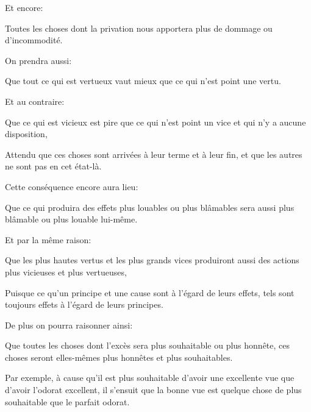 \bigbreak

Et encore:

\begin{lieu}
	Toutes les choses dont la privation nous apportera plus de dommage ou d'incommodité.
\end{lieu}

\bigbreak

On prendra aussi:

\begin{lieu}
	Que tout ce qui est vertueux vaut mieux que ce qui n'est point une vertu.
\end{lieu}

Et au contraire:

\begin{lieu}
	Que ce qui est vicieux est pire que ce qui n'est point un vice et qui n'y a aucune disposition,
\end{lieu}

Attendu que ces choses sont arrivées à leur terme et à leur fin, et que les autres ne sont pas en cet état-là.

\bigbreak

Cette conséquence encore aura lieu:

\begin{lieu}
	Que ce qui produira des effets plus louables ou plus blâmables sera aussi plus blâmable ou plus louable
	lui-même.
\end{lieu}

Et par la même raison:

\begin{lieu}
	Que les plus hautes vertus et les plus grands vices produiront aussi des actions plus vicieuses et plus
	vertueuses,
\end{lieu}

Puisque ce qu'un principe et une cause sont à l’égard de leurs effets, tels sont toujours effets à l'égard de
leurs principes.

\bigbreak

De plus on pourra raisonner ainsi:

\begin{lieu}
	Que toutes les choses dont l'excès sera plus souhaitable ou plus honnête, ces choses seront elles-mêmes
	plus honnêtes et plus souhaitables.
\end{lieu}

Par exemple, à cause qu'il est plus souhaitable d'avoir une excellente vue que d'avoir l'odorat excellent, il
s'ensuit que la bonne vue est quelque chose de plus souhaitable que le parfait odorat.

